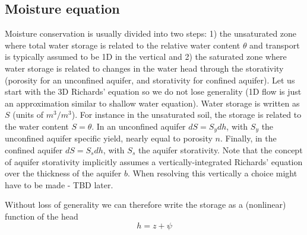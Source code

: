 \documentclass{article}
\begin{document}
\subsection{Moisture equation}
Moisture conservation is usually divided into two steps: 1) the unsaturated zone where total water storage is related to the relative water content $\theta$ and transport is typically assumed to be 1D in the vertical and 2) the saturated zone where water storage is related to changes in the water head through the storativity (porosity for an unconfined aquifer, and storativity for confined aquifer).
Let us start with the 3D Richards' equation so we do not lose generality (1D flow is just an approximation similar to shallow water equation). Water storage is written as $S$ (units of $m^3/m^3$). For instance in the unsaturated soil, the storage is related to the water content $S=\theta$. In an unconfined aquifer $dS=S_y dh$, with $S_y$ the unconfined aquifer specific yield, nearly equal to porosity $n$. Finally, in the confined aquifer $dS=S_s dh$, with $S_s$ the aquifer storativity. Note that the concept of aquifer storativity implicitly assumes a vertically-integrated Richards' equation over the thickness of the aquifer $b$. When resolving this vertically a choice might have to be made - TBD later.

Without loss of generality we can therefore write the storage as a (nonlinear) function of the head 
\begin{equation}
     h=z+\psi
\label{head}
\end{equation}
\end{document}
